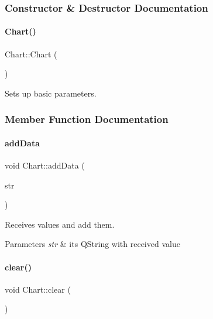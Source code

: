 \subsubsection{Constructor \& Destructor Documentation}
\mbox{\label{classChart_a61896fddeb02818af2892cb6d9cdadb4}} 
\paragraph{\texorpdfstring{Chart()}{Chart()}}
{\footnotesize\ttfamily Chart\+::\+Chart (\begin{DoxyParamCaption}{ }\end{DoxyParamCaption})}



Sets up basic parameters. 



\subsubsection{Member Function Documentation}
\mbox{\label{classChart_abefbafd5e6582e649d40444d16331b94}} 
\paragraph{\texorpdfstring{add\+Data}{addData}}
{\footnotesize\ttfamily void Chart\+::add\+Data (\begin{DoxyParamCaption}\item[{Q\+String}]{str }\end{DoxyParamCaption})\hspace{0.3cm}{\ttfamily [slot]}}



Receives values and add them. 


\begin{DoxyParams}{Parameters}
{\em str} & it\textquotesingle{}s Q\+String with received value \\
\hline
\end{DoxyParams}
\mbox{\label{classChart_a1bf5a87044118c780a83b1ff03428374}} 
\paragraph{\texorpdfstring{clear()}{clear()}}
{\footnotesize\ttfamily void Chart\+::clear (\begin{DoxyParamCaption}{ }\end{DoxyParamCaption})}



